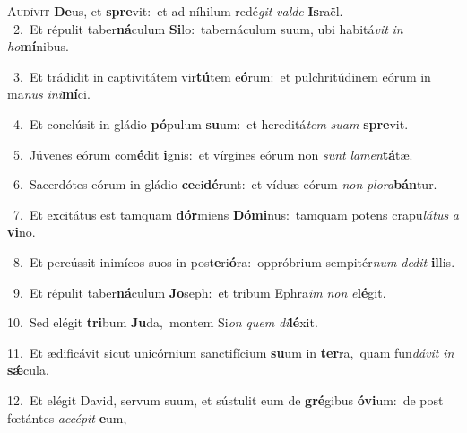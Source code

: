 \lettrine{\initial\textcolor{\initialcolor}{A}}{udívit} \textbf{De}\-us, et \textbf{spre}\-vit:~\star et ad níhilum redé\textit{git} \textit{val}\-\textit{de} \textbf{Is}\-raël.\\
{\numbfont\textcolor{\numbcolor}{~2.}}~Et répulit taber\-\textbf{ná}\-culum \textbf{Si}\-lo:~\star tabernáculum suum, ubi habitá\textit{vit} \textit{in} \textit{ho}\-\textbf{mí}nibus.\par
{\numbfont\textcolor{\numbcolor}{~3.}}~Et trádidit in captivitátem vir\-\textbf{tú}\-tem e\-\textbf{ó}\-rum:~\star et pulchritúdinem eórum in ma\textit{nus} \textit{in}\-\textit{i}\textbf{mí}ci.\par
{\numbfont\textcolor{\numbcolor}{~4.}}~Et conclúsit in gládio \textbf{pó}\-pulum \textbf{su}\-um:~\star et hereditá\textit{tem} \textit{su}\-\textit{am} \textbf{spre}\-vit.\par
{\numbfont\textcolor{\numbcolor}{~5.}}~Júvenes eórum com\-\textbf{é}\-dit \textbf{i}\-gnis:~\star et vírgines eórum non \textit{sunt} \textit{la}\-\textit{men}\textbf{tá}tæ.\par
{\numbfont\textcolor{\numbcolor}{~6.}}~Sacerdótes eórum in gládio \textbf{ce}\-ci\-\textbf{dé}\-runt:~\star et víduæ eórum \textit{non} \textit{plo}\-\textit{ra}\textbf{bán}tur.\par
{\numbfont\textcolor{\numbcolor}{~7.}}~Et excitátus est tamquam \textbf{dór}\-miens \textbf{Dó}\-\textbf{mi}nus:~\star tamquam potens crapu\-\textit{lá}\-\textit{tus} \textit{a} \textbf{vi}\-no.\par
{\numbfont\textcolor{\numbcolor}{~8.}}~Et percússit inimícos suos in post\-\textbf{e}\-ri\-\textbf{ó}\-ra:~\star oppróbrium sempitér\textit{num} \textit{de}\-\textit{dit} \textbf{il}\-lis.\par
{\numbfont\textcolor{\numbcolor}{~9.}}~Et répulit taber\-\textbf{ná}\-culum \textbf{Jo}\-seph:~\star et tribum Ephra\textit{im} \textit{non} \textit{e}\-\textbf{lé}git.\par
{\numbfont\textcolor{\numbcolor}{10.}}~Sed elégit \textbf{tri}\-bum \textbf{Ju}\-da,~\star montem Si\textit{on} \textit{quem} \textit{di}\-\textbf{lé}xit.\par
{\numbfont\textcolor{\numbcolor}{11.}}~Et ædificávit sicut unicórnium sanctifícium \textbf{su}\-um in \textbf{ter}\-ra,~\star quam fun\-\textit{dá}\-\textit{vit} \textit{in} \textbf{sǽ}\-cula.\par
{\numbfont\textcolor{\numbcolor}{12.}}~Et elégit David, servum suum, et sústulit eum de \textbf{gré}\-gibus \textbf{ó}\-\textbf{vi}um:~\star de post fœtántes \textit{ac}\-\textit{cé}\textit{pit} \textbf{e}\-um,\par
